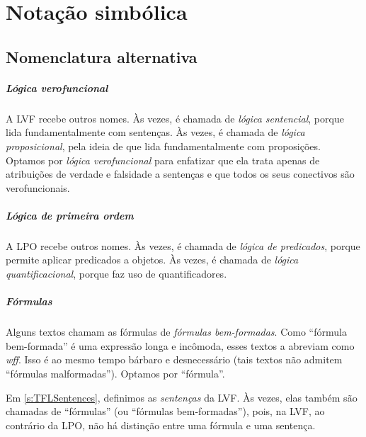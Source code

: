 
\chapter{Notação simbólica}
\label{app.notation}

\section{Nomenclatura alternativa}

\paragraph{Lógica verofuncional} A LVF recebe outros nomes. Às vezes, é chamada de \emph{lógica sentencial}, porque lida fundamentalmente com sentenças. Às vezes, é chamada de \emph{lógica proposicional}, pela ideia de que lida fundamentalmente com proposições. Optamos por \emph{lógica verofuncional} para enfatizar que ela trata apenas de atribuições de verdade e falsidade a sentenças e que todos os seus conectivos são verofuncionais.

\paragraph{Lógica de primeira ordem} A LPO recebe outros nomes. Às vezes, é chamada de \emph{lógica de predicados}, porque permite aplicar predicados a objetos. Às vezes, é chamada de \emph{lógica quantificacional}, porque faz uso de quantificadores.

\paragraph{Fórmulas} Alguns textos chamam as fórmulas de \emph{fórmulas bem-formadas}. Como \textquotedblleft fórmula bem-formada\textquotedblright{} é uma expressão longa e incômoda, esses textos a abreviam como \emph{wff}. Isso é ao mesmo tempo bárbaro e desnecessário (tais textos não admitem \textquotedblleft fórmulas malformadas\textquotedblright{}). Optamos por \textquotedblleft fórmula\textquotedblright{}.

Em \cref{s:TFLSentences}, definimos as \emph{sentenças} da LVF. Às vezes, elas também são chamadas de \textquotedblleft fórmulas\textquotedblright{} (ou \textquotedblleft fórmulas bem-formadas\textquotedblright{}), pois, na LVF, ao contrário da LPO, não há distinção entre uma fórmula e uma sentença.

